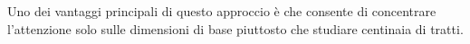 Uno dei vantaggi principali di questo approccio è che consente di concentrare l'attenzione solo sulle dimensioni di base piuttosto che studiare centinaia di tratti.


